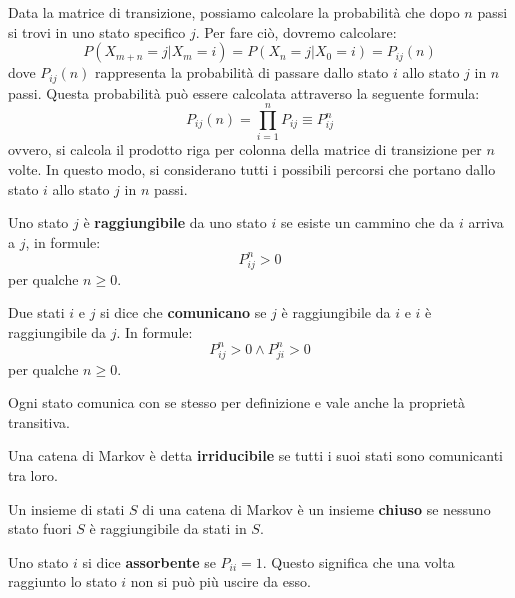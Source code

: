 Data la matrice di transizione, possiamo calcolare la probabilità che dopo $n$
passi si trovi in uno stato specifico $j$. Per fare ciò, dovremo calcolare:
\begin{equation}
    P(X_{m + n} = j | X_{m} = i) = P(X_n = j | X_0 = i)=P_{ij}(n)
\end{equation}
dove $P_{ij}(n)$ rappresenta la probabilità di passare dallo stato $i$ allo stato
$j$ in $n$ passi. Questa probabilità può essere calcolata attraverso la seguente
formula:
\begin{equation}
    P_{ij}(n) = \prod_{i = 1}^{n} P_{ij} \equiv P^n_{ij}
\end{equation}
ovvero, si calcola il prodotto riga per colonna della matrice di transizione
per $n$ volte. In questo modo, si considerano tutti i possibili percorsi che
portano dallo stato $i$ allo stato $j$ in $n$ passi.
\begin{definizione}
    Uno stato $j$ è \textbf{raggiungibile} da uno stato $i$ se esiste un cammino
    che da $i$ arriva a $j$, in formule:
    \begin{equation*}
        P^n_{ij}>0
    \end{equation*}
    per qualche $n\geq 0$.
\end{definizione}
\begin{definizione}
    Due stati $i$ e $j$ si dice che \textbf{comunicano} se $j$ è raggiungibile
    da $i$ e $i$ è raggiungibile da $j$. In formule:
    \begin{equation*}
        P^n_{ij}>0 \land P^n_{ji}>0
    \end{equation*}
    per qualche $n\geq 0$.
\end{definizione}
\begin{nota}
    Ogni stato comunica con se stesso per definizione e vale anche la proprietà
    transitiva.
\end{nota}
\begin{definizione}
    Una catena di Markov è detta \textbf{irriducibile} se tutti i suoi stati sono
    comunicanti tra loro.
\end{definizione}
\begin{definizione}
    Un insieme di stati $S$ di una catena di Markov è un insieme \textbf{chiuso}
    se nessuno stato fuori $S$ è raggiungibile da stati in $S$.
\end{definizione}
\begin{definizione}
    Uno stato $i$ si dice \textbf{assorbente} se $P_{ii} = 1$. Questo significa
    che una volta raggiunto lo stato $i$ non si può più uscire da esso.
\end{definizione}
